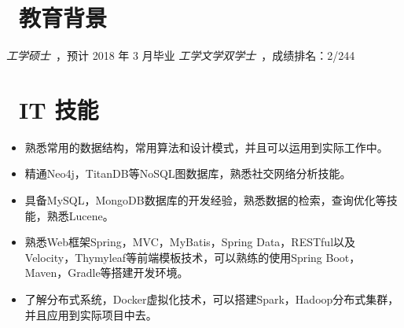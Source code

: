 \documentclass{resume}
\begin{document}



 
\section{\faGraduationCap\  教育背景}
\textit{工学硕士}\ ，预计 2018 年 3 月毕业
\textit{工学文学双学士}\ ，成绩排名：2/244

\section{\faCogs\ IT 技能}
\begin{itemize}[parsep=0.5ex]
  \item 熟悉常用的数据结构，常用算法和设计模式，并且可以运用到实际工作中。
  \item 精通Neo4j，TitanDB等NoSQL图数据库，熟悉社交网络分析技能。
  \item 具备MySQL，MongoDB数据库的开发经验，熟悉数据的检索，查询优化等技能，熟悉Lucene。
  \item 熟悉Web框架Spring，MVC，MyBatis，Spring Data，RESTful以及Velocity，Thymyleaf等前端模板技术，可以熟练的使用Spring Boot，Maven，Gradle等搭建开发环境。
  \item 了解分布式系统，Docker虚拟化技术，可以搭建Spark，Hadoop分布式集群，并且应用到实际项目中去。
\end{itemize}
\end{document}
